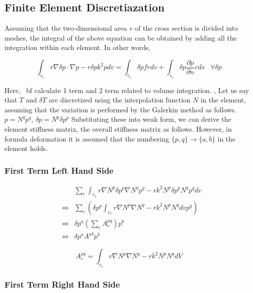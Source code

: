 \subsection{Finite Element Discretiazation}
Assuming that the two-dimensional area $v$ of the cross section is divided into meshes, the integral of the above equation can be obtained by adding all the integration within each element. In other words,

\begin{equation}
\int_{v_e} r\nabla\delta p \cdot\nabla p - r\delta p k^2 p  dv = \int_{v_e} \delta p f rdv + \int_{s_e} \delta p\frac{\partial p}{\partial n} rds\;\;\;\forall \delta p
\end{equation}

Here, {\ bf calculate 1 term and 2 term related to volume integration}. , Let us say that $T$ and $\delta T$ are discretized using the interpolation function $N$ in the element, assuming that the variation is performed by the Galerkin method as follows.
$p = N^q p^q$, $\delta p = N^p \delta p^p$
Substituting these into weak form, we can derive the element stiffness matrix, the overall stiffness matrix as follows. However, in formula deformation it is assumed that the numbering $\{p,q\}\rightarrow \{a,b\}$ in the element holds.

\subsubsection{First Term Left Hand Side}

\begin{eqnarray}
&& \sum_e\int_{v_e} r\nabla N^p\delta p^p\nabla N^qp^q - rk^2N^p\delta p^pN^q p^qdv\\
&\Leftrightarrow& \sum_e\left(\delta p^p\int_{v_e}  r\nabla N^p\nabla N^q - rk^2 N^pN^qdv p^q\right)\\
&\Leftrightarrow& \delta p^a\left(\sum_e A_e^{pq} \right) p^b\\
&\Leftrightarrow& \delta p^a A^{ab} p^b
\end{eqnarray}

\begin{tcolorbox}[title=coefficient matrix]
\begin{equation}
A_e^{pq}=\int_{v_e}r\nabla N^p\nabla N^q - rk^2 N^pN^q dV
\end{equation}
\end{tcolorbox}


\subsubsection{First Term Right Hand Side}

